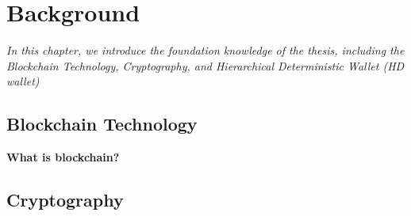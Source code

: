 \setlength{\abovedisplayskip}{0pt}
\setlength{\belowdisplayskip}{0pt}
\setlength{\abovedisplayshortskip}{0pt}
\setlength{\belowdisplayshortskip}{0pt}

\chapter{Background}
\label{chap:background}

\textit{In this chapter, we introduce the foundation knowledge of the thesis, including the Blockchain Technology, Cryptography, and Hierarchical Deterministic Wallet (HD wallet)}

\minitoc

\section{Blockchain Technology}
\label{blockchain}
\bigskip
{\textbf{What is blockchain?}}

\section{Cryptography}
\label{cryptography}


